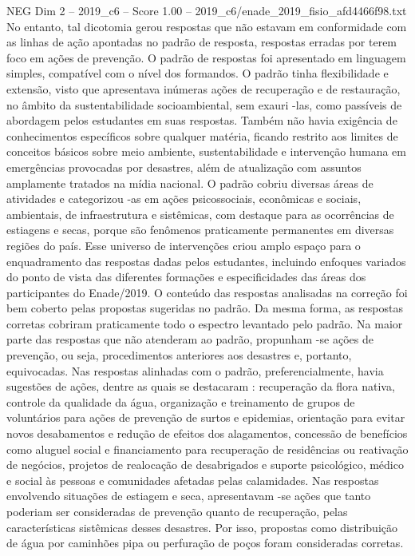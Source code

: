 \begin{textsample}{NEG Dim 2 – 2019\_c6 – Score 1.00 – 2019\_c6/enade\_2019\_fisio\_afd4466f98.txt}
No entanto, tal dicotomia gerou respostas que não estavam em conformidade com as linhas de ação apontadas no padrão de resposta, respostas erradas por terem foco em ações de prevenção.
O padrão de respostas foi apresentado em linguagem simples, compatível com o nível dos formandos.
O padrão tinha flexibilidade e extensão, visto que apresentava inúmeras ações de recuperação e de restauração, no âmbito da sustentabilidade socioambiental, sem exauri -las, como passíveis de abordagem pelos estudantes em suas respostas.
Também não havia exigência de conhecimentos específicos sobre qualquer matéria, ficando restrito aos limites de conceitos básicos sobre meio ambiente, sustentabilidade e intervenção humana em emergências provocadas por desastres, além de atualização com assuntos amplamente tratados na mídia nacional.
O padrão cobriu diversas áreas de atividades e categorizou -as em ações psicossociais, econômicas e sociais, ambientais, de infraestrutura e sistêmicas, com destaque para as ocorrências de estiagens e secas, porque são fenômenos praticamente permanentes em diversas regiões do país.
Esse universo de intervenções criou amplo espaço para o enquadramento das respostas dadas pelos estudantes, incluindo enfoques variados do ponto de vista das diferentes formações e especificidades das áreas dos participantes do Enade/2019.
O conteúdo das respostas analisadas na correção foi bem coberto pelas propostas sugeridas no padrão.
Da mesma forma, as respostas corretas cobriram praticamente todo o espectro levantado pelo padrão.
Na maior parte das respostas que não atenderam ao padrão, propunham -se ações de prevenção, ou seja, procedimentos anteriores aos desastres e, portanto, equivocadas.
Nas respostas alinhadas com o padrão, preferencialmente, havia sugestões de ações, dentre as quais se destacaram : recuperação da flora nativa, controle da qualidade da água, organização e treinamento de grupos de voluntários para ações de prevenção de surtos e epidemias, orientação para evitar novos desabamentos e redução de efeitos dos alagamentos, concessão de benefícios como aluguel social e financiamento para recuperação de residências ou reativação de negócios, projetos de realocação de desabrigados e suporte psicológico, médico e social às pessoas e comunidades afetadas pelas calamidades.
Nas respostas envolvendo situações de estiagem e seca, apresentavam -se ações que tanto poderiam ser consideradas de prevenção quanto de recuperação, pelas características sistêmicas desses desastres.
Por isso, propostas como distribuição de água por caminhões pipa ou perfuração de poços foram consideradas corretas.

\end{textsample}
